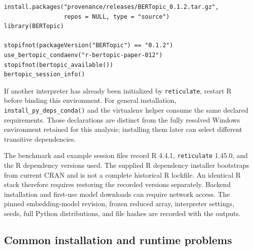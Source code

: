 \documentclass[12pt]{article}
\newcommand{\pkg}[1]{\texttt{#1}}
\newcommand{\code}[1]{\texttt{#1}}
\begin{document}
\begin{lstlisting}[float=htbp,caption={Installing the tested R package and binding its Python backend.}]
install.packages("provenance/releases/BERTopic_0.1.2.tar.gz",
                 repos = NULL, type = "source")
library(BERTopic)

stopifnot(packageVersion("BERTopic") == "0.1.2")
use_bertopic_condaenv("r-bertopic-paper-012")
stopifnot(bertopic_available())
bertopic_session_info()
\end{lstlisting}

If another interpreter has already been initialized by \pkg{reticulate}, restart R before binding this environment. For general installation, \code{install\_py\_deps\_conda()} and the virtualenv helper consume the same declared requirements. Those declarations are distinct from the fully resolved Windows environment retained for this analysis; installing them later can select different transitive dependencies.

The benchmark and example session files record R 4.4.1, \pkg{reticulate} 1.45.0, and the R dependency versions used. The supplied R dependency installer bootstraps from current CRAN and is not a complete historical R lockfile. An identical R stack therefore requires restoring the recorded versions separately. Backend installation and first-use model downloads can require network access. The pinned embedding-model revision, frozen reduced array, interpreter settings, seeds, full Python distributions, and file hashes are recorded with the outputs.

\subsection{Common installation and runtime problems}
\end{document}
